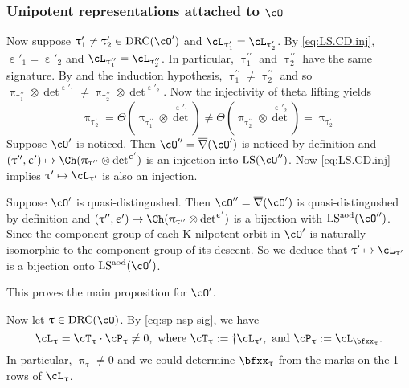 \documentclass[12pt,a4paper]{amsart}
\newcommand{\bfone}{\mathbf{1}}
\def\eDD{\overline{\nabla}}
\numberwithin{equation}{section}
\theoremstyle{remark}
\def\ssign{\mathrm{Sign}}
\def\Thetab{\bar{\Theta}}
\def\drc{\mathrm{DRC}}
\def\LS{\mathrm{LS}}
\def\LSaod{\mathrm{LS^{aod}}}
\def\cOp{\cO^{\prime}}
\def\cOpp{\cO^{\prime\prime}}
\def\uptaup{\uptau^{\prime}}
\def\uptaupp{\uptau^{\prime\prime}}
\begin{document}
\subsubsection{Unipotent representations attached to $\cO$}
Now suppose $\uptaup_{1}\neq \uptaup_{2}\in \drc(\cOp)$ and
$\cL_{\uptaup_{1}}=\cL_{\uptaup_{2}}$. By \eqref{eq:LS.CD.inj},
$\upepsilon'_{1}=\upepsilon'_{2}$ and $\cL_{\uptaupp_{1}}=\cL_{\uptaupp_{2}}$.
In particular,  $\uptaupp_{1}$ and $\uptaupp_{2}$  have the same signature. %
By  and the induction hypothesis, $\uptaupp_{1}\neq \uptaupp_{2}$ and so
$\uppi_{\uptaupp_{1}}\otimes {\det}^{\upepsilon'_{1}} \neq \uppi_{\uptaupp_{2}}\otimes {\det}^{\upepsilon'_{2}}$.
Now the injectivity of theta lifting yields
\[
  \uppi_{\uptaup_{2}} = \Thetab(\uppi_{\uptaupp_{1}}\otimes {\det}^{\upepsilon'_{1}})
  \neq \Thetab(\uppi_{\uptaupp_{2}}\otimes {\det}^{\upepsilon'_{2}}) = \uppi_{\uptaup_{2}}
\]
Suppose $\cOp$ is noticed. Then $\cOpp = \eDD(\cOp)$ is noticed by definition
and
$(\uptaupp,\upepsilon')\mapsto \Ch(\uppi_{\uptaupp}\otimes{\det}^{\upepsilon'})$
is an injection into $\LS(\cOpp)$.
Now \eqref{eq:LS.CD.inj} implies $\uptaup\mapsto\cL_{\uptaup}$ is also an injection.

Suppose $\cOp$ is quasi-distingushed. Then $\cOpp = \eDD(\cOp)$ is
quasi-distingushed by definition
and
$(\uptaupp,\upepsilon')\mapsto \Ch(\uppi_{\uptaupp}\otimes{\det}^{\upepsilon'})$
is  a bijection with $\LSaod(\cOpp)$.
Since the component group of each K-nilpotent orbit in $\cOp$ is naturally
isomorphic to the component group of its descent. So we deduce that $\uptaup \mapsto \cL_{\uptaup}$
is a bijection onto $\LSaod(\cOp)$.

This proves the main proposition for $\cOp$.


Now let $\uptau\in \drc(\cO)$. %
By \eqref{eq:sp-nsp-sig}, we have
\begin{equation}\label{eq:LS.D.ds}
  \cL_{\uptau} =  \cT_{\uptau}\cdot \cP_{\uptau}\neq 0, \text{ where
  }\cT_{\uptau} := \dagger\cL_{\uptaup}, \text{ and } \cP_{\uptau}:=\cL_{\bfxx_{\uptau}}.
\end{equation}
In particular, $\uppi_{\uptau}\neq 0$ and we could determine $\bfxx_{\uptau}$ from
the marks on the 1-rows of $\cL_{\uptau}$.

\end{document}
